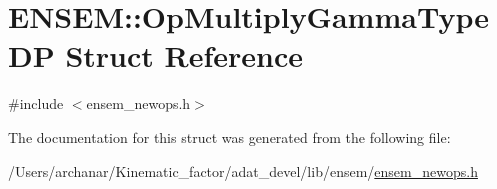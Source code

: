 \hypertarget{structENSEM_1_1OpMultiplyGammaTypeDP}{}\section{E\+N\+S\+EM\+:\+:Op\+Multiply\+Gamma\+Type\+DP Struct Reference}
\label{structENSEM_1_1OpMultiplyGammaTypeDP}


{\ttfamily \#include $<$ensem\+\_\+newops.\+h$>$}



The documentation for this struct was generated from the following file\+:\begin{DoxyCompactItemize}
\item 
/\+Users/archanar/\+Kinematic\+\_\+factor/adat\+\_\+devel/lib/ensem/\mbox{\hyperlink{lib_2ensem_2ensem__newops_8h}{ensem\+\_\+newops.\+h}}\end{DoxyCompactItemize}
